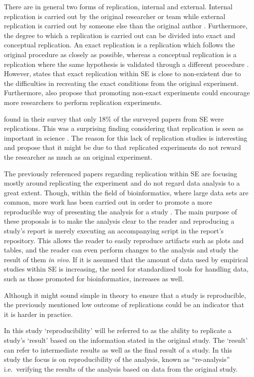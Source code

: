 There are in general two forms of replication, internal and external. Internal replication is carried out by the original researcher or team while external replication is carried out by someone else than the original author \citep{brooks2008replication}. Furthermore, the degree to which a replication is carried out can be divided into exact and conceptual replication. An exact replication is a replication which follows the original procedure as closely as possible, whereas a conceptual replication is a replication where the same hypothesis is validated through a different procedure \citep{shull2008role}. However, \citet{juristo2011role} states that exact replication within SE is close to non-existent due to the difficulties in recreating the exact conditions from the original experiment. Furthermore, \citet{juristo2011role} also propose that promoting non-exact experiments could encourage more researchers to perform replication experiments.




\citet{sjoberg2005survey} found in their survey that only 18\% of the surveyed papers from SE were replications. This was a surprising finding considering that replication is seen as important in science \citep{lindsay1993design}. The reason for this lack of replication studies is interesting and \citet{lindsay1993design} propose that it might be due to that replicated experiments do not reward the researcher as much as an original experiment.




The previously referenced papers regarding replication within SE are focusing mostly around replicating the experiment and do not regard data analysis to a great extent. Though, within the field of bioinformatics, where large data sets are common, more work has been carried out in order to promote a more reproducible way of presenting the analysis for a study \citet{tan2010advancing, gentleman2004reproducible, preeyanon2014reproducible}. The main purpose of these proposals is to make the analysis clear to the reader and reproducing a study's report is merely executing an accompanying script in the report's repository. This allows the reader to easily reproduce artifacts such as plots and tables, and the reader can even perform changes to the analysis and study the result of them \emph{in vivo}. If it is assumed that the amount of data used by empirical studies within SE is increasing, the need for standardized tools for handling data, such as those promoted for bioinformatics, increases as well.




Although it might sound simple in theory to ensure that a study is reproducible, the previously mentioned low outcome of replications could be an indicator that it is harder in practice.




In this study `reproducibility' will be referred to as the ability to replicate a study's `result' based on the information stated in the original study. The `result' can refer to intermediate results as well as the final result of a study. In this study the focus is on reproducibility of the analysis, known as ``re-analysis'' \citep{gomez2010replication} i.e.\ verifying the results of the analysis based on data from the original study.
